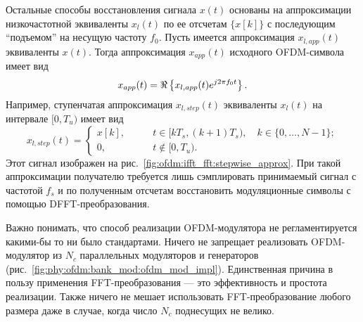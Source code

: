 \documentclass{book}
\numberwithin{theorem}{chapter}
\numberwithin{statement}{chapter}
\numberwithin{lemma}{chapter}
\theoremstyle{definition}
\numberwithin{task}{chapter}
\theoremstyle{remark}
\numberwithin{example}{chapter}
\theoremstyle{definition}
\numberwithin{definition}{chapter}
\theoremstyle{remark}
\theoremstyle{remark}
\numberwithin{lyrics}{section}
\begin{document}
Остальные способы восстановления сигнала $x(t)$ основаны на аппроксимации низкочастотной эквиваленты $x_l(t)$ по ее отсчетам $\{x[k]\}$ с последующим ``подъемом'' на несущую частоту $f_0$. Пусть имеется аппроксимация $x_{l, app}(t)$ эквиваленты $x(t)$. Тогда аппроксимация $x_{app}(t)$ исходного OFDM-символа имеет вид
$$
x_{app}(t) = \Re\left\{x_{l, app}(t) e^{j2\pi f_0 t}\right\}.
$$
Например, ступенчатая аппроксимация $x_{l, step}(t)$ эквиваленты $x_l(t)$ на интервале $[0, T_u)$ имеет вид
\begin{equation}
\label{eq:phy:ofdm:ifft_fft:stepwise_approx}
x_{l, step}(t) = \begin{cases}
x[k],\qquad &t \in [kT_s, (k+1)T_s),\quad k \in \{0,\dots,N-1\};\\
0,\qquad &t \notin [0, T_u).
\end{cases}
\end{equation}
Этот сигнал изображен на рис.~\ref{fig:ofdm:ifft_fft:stepwise_approx}. При такой аппроксимации получателю требуется лишь сэмплировать принимаемый сигнал с частотой $f_s$ и по полученным отсчетам восстановить модуляционные символы с помощью DFFT-преобразования.


Важно понимать, что способ реализации OFDM-модулятора не регламентируется какими-бы то ни было стандартами. Ничего не запрещает реализовать OFDM-модулятор из $N_c$ параллельных модуляторов и генераторов (рис.~\ref{fig:phy:ofdm:bank_mod:ofdm_mod_impl}). Единственная причина в пользу применения FFT-преобразования --- это эффективность и простота реализации. Также ничего не мешает использовать FFT-преобразование любого размера даже в случае, когда число $N_c$ поднесущих не велико. 
\end{document}
